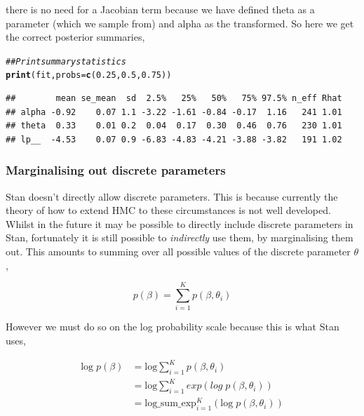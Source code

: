 \documentclass[11pt,fullpage]{book}
\makeatletter
\newenvironment{kframe}{%
	\def\at@end@of@kframe{}%
	\ifinner\ifhmode%
	\def\at@end@of@kframe{\end{minipage}}%
\begin{minipage}{\columnwidth}%
	\fi\fi%
	\def\FrameCommand##1{\hskip\@totalleftmargin \hskip-\fboxsep
		\colorbox{shadecolor}{##1}\hskip-\fboxsep
		\hskip-\linewidth \hskip-\@totalleftmargin \hskip\columnwidth}%
	\MakeFramed {\advance\hsize-\width
		\@totalleftmargin\z@ \linewidth\hsize
		\@setminipage}}%
{\par\unskip\endMakeFramed%
	\at@end@of@kframe}
\newcommand{\hlnum}[1]{\textcolor[rgb]{0.686,0.059,0.569}{#1}}%
\newcommand{\hlcom}[1]{\textcolor[rgb]{0.678,0.584,0.686}{\textit{#1}}}%
\newcommand{\hlstd}[1]{\textcolor[rgb]{0.345,0.345,0.345}{#1}}%
\newcommand{\hlkwc}[1]{\textcolor[rgb]{0.333,0.667,0.333}{#1}}%
\newcommand{\hlkwd}[1]{\textcolor[rgb]{0.737,0.353,0.396}{\textbf{#1}}}%
\newenvironment{knitrout}{}{} %
\makeatother
\begin{document}
there is no need for a Jacobian term because we have defined theta as a parameter (which we sample from) and alpha as the transformed. So here we get the correct posterior summaries,

\begin{knitrout}\small
		\color{fgcolor}\begin{kframe}
			\begin{alltt}
				\hlcom{## Print summary statistics}
				\hlkwd{print}\hlstd{(fit,}\hlkwc{probs} \hlstd{=} \hlkwd{c}\hlstd{(}\hlnum{0.25}\hlstd{,} \hlnum{0.5}\hlstd{,} \hlnum{0.75}\hlstd{))}
			\end{alltt}
			\begin{verbatim}
##        mean se_mean  sd  2.5%   25%   50%   75% 97.5% n_eff Rhat
## alpha -0.92    0.07 1.1 -3.22 -1.61 -0.84 -0.17  1.16   241 1.01
## theta  0.33    0.01 0.2  0.04  0.17  0.30  0.46  0.76   230 1.01
## lp__  -4.53    0.07 0.9 -6.83 -4.83 -4.21 -3.88 -3.82   191 1.02
			\end{verbatim}
		\end{kframe}
	\end{knitrout}


\subsubsection{Marginalising out discrete parameters}\label{sec:StanJags_discrete}
Stan doesn't directly allow discrete parameters. This is because currently the theory of how to extend HMC to these circumstances is not well developed. Whilst in the future it may be possible to directly include discrete parameters in Stan, fortunately it is still possible to \textit{indirectly} use them, by marginalising them out. This amounts to summing over all possible values of the discrete parameter $\theta$,

\begin{equation}
p(\beta) = \sum\limits_{i=1}^{K} p(\beta,\theta_i)
\end{equation}

However we must do so on the log probability scale because this is what Stan uses,

\begin{align}
\text{log} \; p(\beta) &= \text{log} \sum_{i=1}^{K} p(\beta,\theta_i)\\
&= \text{log} \sum_{i=1}^{K} exp\left( log\; p(\beta,\theta_i)\right)\\
&= \text{log}\_\text{sum}\_\text{exp}_{i=1}^{K}(\text{log}\; p(\beta,\theta_i))
\end{align}
\end{document}
